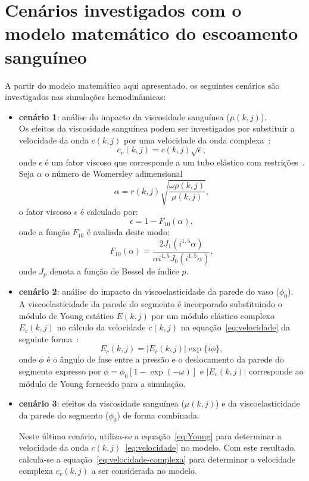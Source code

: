 \documentclass[
        english,			
        brazil			        %
        ,<...>]{abntbibufjf}
\begin{document}
\section{Cenários investigados com o modelo matemático do escoamento sanguíneo}
\label{sec:cenario}
A partir do modelo matemático aqui apresentado, os seguintes cenários são investigados nas simulações hemodinâmicas:
\begin{itemize}
	\item \textbf{cenário 1}: análise do impacto da viscosidade sanguínea ($\mu(k,j)$).\\
	Os efeitos da viscosidade sanguínea podem ser investigados por substituir a velocidade
	da onda $c(k,j)$ por uma velocidade da onda complexa~\cite{Duan1992}:
	\begin{equation} 
	c_v(k,j) = c(k,j) \sqrt{\epsilon},\label{eq:velocidade-complexa}
	\end{equation}
	onde $\epsilon$ é um fator viscoso que corresponde a um tubo elástico com restrições~\cite{Duan1992}. Seja $\alpha$ o
	número de Womersley adimensional
	\begin{equation}
	\alpha = r(k,j) \sqrt{\frac{\omega \rho(k,j)}{\mu(k,j)}},
	\end{equation}
	o fator viscoso $\epsilon$ é calculado por:
	\begin{equation}
	\epsilon = 1 - F_{10} (\alpha),
	\end{equation}
	onde a função $F_{10}$ é avaliada deste modo:
	\begin{equation}
	F_{10} (\alpha) = \frac{2 J_1(i^{1,5} \alpha)}{\alpha i^{1,5}J_0(i^{1,5} \alpha)},
	\end{equation}
	onde $J_p$ denota a função de Bessel de índice $p$.
	
	\item \textbf{cenário 2}: análise do impacto da viscoelasticidade da parede do vaso ($\phi_0$).\\
	A viscoelasticidade da parede do segmento é incorporado substituindo o módulo de Young
	estático $E(k,j)$ por um módulo elástico complexo $E_c(k,j)$ no cálculo da velocidade $c(k,j)$ na equação~\eqref{eq:velocidade}
	da seguinte forma~\cite{Duan}:
	\begin{equation}
	E_c(k,j) = |E_c(k,j)| \exp\{i\phi\},\label{eq:Young}
	\end{equation}
	onde $\phi$ é o ângulo de fase entre a pressão e o deslocamento da parede do segmento \cite{Taylor3} expresso por $\phi = \phi_0 [1-\exp(-\omega)]$ e $|E_c (k,j)|$ corresponde ao módulo de Young fornecido para a simulação.
	
	\item \textbf{cenário 3}: efeitos da viscosidade sanguínea ($\mu(k,j)$) e da viscoelasticidade da parede do segmento ($\phi_0$) de forma combinada.
	
	Neste último cenário, utiliza-se a equação~\eqref{eq:Young} para determinar a velocidade da onda $c(k,j)$~\eqref{eq:velocidade} no modelo. Com este resultado, calcula-se  a equação~\eqref{eq:velocidade-complexa} para determinar a velocidade complexa $c_v(k,j)$ a ser considerada no modelo.
\end{itemize}
\end{document}
